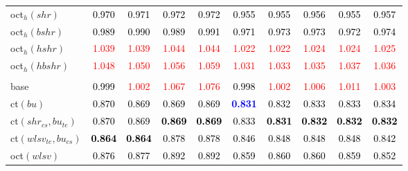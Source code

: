 \begin{tabular}[t]{>{\centering\arraybackslash}m{2.5cm}ccccccccc}
oct$_h(shr)$ & \textcolor{black}{0.970} & \textcolor{black}{0.971} & \textcolor{black}{0.972} & \textcolor{black}{0.972} & \textcolor{black}{0.955} & \textcolor{black}{0.955} & \textcolor{black}{0.956} & \textcolor{black}{0.955} & \textcolor{black}{0.957}\\
oct$_h(bshr)$ & \textcolor{black}{0.989} & \textcolor{black}{0.990} & \textcolor{black}{0.989} & \textcolor{black}{0.991} & \textcolor{black}{0.971} & \textcolor{black}{0.973} & \textcolor{black}{0.973} & \textcolor{black}{0.972} & \textcolor{black}{0.974}\\
oct$_h(hshr)$ & \textcolor{red}{1.039} & \textcolor{red}{1.039} & \textcolor{red}{1.044} & \textcolor{red}{1.044} & \textcolor{red}{1.022} & \textcolor{red}{1.022} & \textcolor{red}{1.024} & \textcolor{red}{1.024} & \textcolor{red}{1.025}\\
oct$_h(hbshr)$ & \textcolor{red}{1.048} & \textcolor{red}{1.050} & \textcolor{red}{1.056} & \textcolor{red}{1.059} & \textcolor{red}{1.031} & \textcolor{red}{1.033} & \textcolor{red}{1.035} & \textcolor{red}{1.037} & \textcolor{red}{1.036}\\
\addlinespace[0.3em]
\multicolumn{10}{c}{\textbf{$k = 2$}}\\
base & \textcolor{black}{0.999} & \textcolor{red}{1.002} & \textcolor{red}{1.067} & \textcolor{red}{1.076} & \textcolor{black}{0.998} & \textcolor{red}{1.002} & \textcolor{red}{1.006} & \textcolor{red}{1.011} & \textcolor{red}{1.003}\\
ct$(bu)$ & \textcolor{black}{0.870} & \textcolor{black}{0.869} & \textcolor{black}{0.869} & \textcolor{black}{0.869} & \textcolor{blue}{\textbf{0.831}} & \textcolor{black}{0.832} & \textcolor{black}{0.833} & \textcolor{black}{0.833} & \textcolor{black}{0.834}\\
ct$(shr_{cs}, bu_{te})$ & \textcolor{black}{0.870} & \textcolor{black}{0.869} & \textcolor{black}{\textbf{0.869}} & \textcolor{black}{\textbf{0.869}} & \textcolor{black}{0.833} & \textcolor{black}{\textbf{0.831}} & \textcolor{black}{\textbf{0.832}} & \textcolor{black}{\textbf{0.832}} & \textcolor{black}{\textbf{0.832}}\\
ct$(wlsv_{te}, bu_{cs})$ & \textcolor{black}{\textbf{0.864}} & \textcolor{black}{\textbf{0.864}} & \textcolor{black}{0.878} & \textcolor{black}{0.878} & \textcolor{black}{0.846} & \textcolor{black}{0.848} & \textcolor{black}{0.848} & \textcolor{black}{0.848} & \textcolor{black}{0.842}\\
oct$(wlsv)$ & \textcolor{black}{0.876} & \textcolor{black}{0.877} & \textcolor{black}{0.892} & \textcolor{black}{0.892} & \textcolor{black}{0.859} & \textcolor{black}{0.860} & \textcolor{black}{0.860} & \textcolor{black}{0.859} & \textcolor{black}{0.852}\\

\end{tabular}

